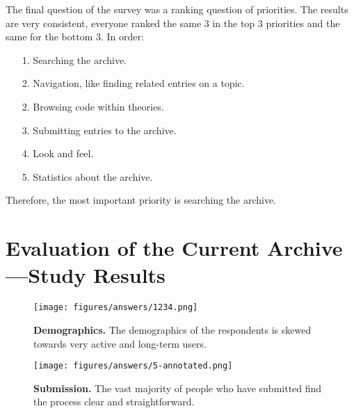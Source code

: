 \documentclass[bsc,frontabs,oneside,singlespacing,parskip,deptreport,logo]{infthesis}
\begin{document}
The final question of the survey was a ranking question of priorities. The results are very consistent, everyone ranked the same 3 in the top 3 priorities and the same for the bottom 3. In order:

\begin{itemize}
    \item [1.] Searching the archive.
    \item [2.] Navigation, like finding related entries on a topic.
    \item [2.] Browsing code within theories.
    \item [3.] Submitting entries to the archive.
    \item [4.] Look and feel.
    \item [5.] Statistics about the archive.
\end{itemize}

Therefore, the most important priority is searching the archive. 

\chapter{Evaluation of the Current Archive---Study Results}
\label{appendix-afp-eval}

\begin{figure}[ht]
    \centering
    \texttt{[image: figures/answers/1234.png]}
    \caption{\textbf{Demographics.}
    The demographics of the respondents is skewed towards very active and long-term users.}
    \label{fig:demographics}
    \medskip
\end{figure}


\begin{figure}[ht]
    \centering
    \texttt{[image: figures/answers/5-annotated.png]}
    \caption{\textbf{Submission.} The vast majority of people who have submitted find the process clear and straightforward.}
    \label{fig:submission-1}
    \medskip
\end{figure}
\end{document}

